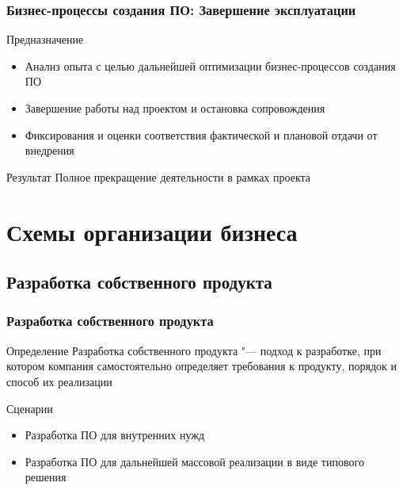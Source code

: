 \documentclass{../industrial-development}
\begin{document}
\begin{frame} \frametitle{Бизнес-процессы создания ПО: Завершение эксплуатации}
	\begin{block}{Предназначение}
		\begin{itemize}
			\item Анализ опыта с целью дальнейшей оптимизации бизнес-процессов создания ПО
			\item Завершение работы над проектом и остановка сопровождения
			\item Фиксирования и оценки соответствия фактической и плановой отдачи от внедрения
		\end{itemize}
	\end{block}
	\begin{block}{Результат}
		Полное прекращение деятельности в рамках проекта
	\end{block}
\end{frame}
\lecturenotes


\section{Схемы организации бизнеса}

\subsection{Разработка собственного продукта}


\begin{frame} \frametitle{Разработка собственного продукта}
	\begin{block}{Определение}
		\alert{Разработка собственного продукта} "--- подход к разработке, при котором компания самостоятельно определяет требования к продукту, порядок и способ их реализации
	\end{block}
	\begin{block}{Сценарии}
		\begin{itemize}
			\item Разработка ПО для внутренних нужд
			\item Разработка ПО для дальнейшей массовой реализации в виде типового решения
		\end{itemize}
	\end{block}
\end{frame}
\lecturenotes
\end{document}
